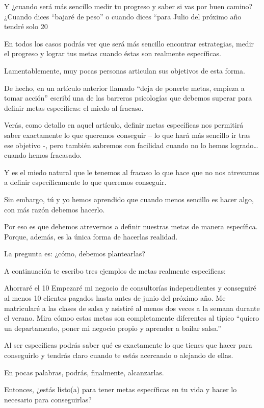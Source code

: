 \documentclass[12pt]{book}
\begin{document}
Y ¿cuando será más sencillo medir tu progreso y saber si vas por buen camino? ¿Cuando dices “bajaré de peso” o cuando dices “para Julio del próximo año tendré solo 20%

En todos los casos podrás ver que será más sencillo encontrar estrategias, medir el progreso y lograr tus metas cuando éstas son realmente específicas.

Lamentablemente, muy pocas personas articulan sus objetivos de esta forma.

De hecho, en un artículo anterior llamado “deja de ponerte metas, empieza a tomar acción” escribí una de las barreras psicologías que debemos superar para definir metas específicas: el miedo al fracaso.

Verás, como detallo en aquel artículo, definir metas específicas nos permitirá saber exactamente lo que queremos conseguir – lo que hará más sencillo ir tras ese objetivo -, pero también sabremos con facilidad cuando no lo hemos logrado… cuando hemos fracasado.

Y es el miedo natural que le tenemos al fracaso lo que hace que no nos atrevamos a definir específicamente lo que queremos conseguir.

Sin embargo, tú y yo hemos aprendido que cuando menos sencillo es hacer algo, con más razón debemos hacerlo.

Por eso es que debemos atrevernos a definir nuestras metas de manera específica. Porque, además, es la única forma de hacerlas realidad.

La pregunta es: ¿cómo, debemos plantearlas?

A continuación te escribo tres ejemplos de metas realmente especificas:

Ahorraré el 10%
Empezaré mi negocio de consultorías independientes y conseguiré al menos 10 clientes pagados hasta antes de junio del próximo año.
Me matricularé a las clases de salsa y asistiré al menos dos veces a la semana durante el verano.
Mira cómoo estas metas son completamente diferentes al típico “quiero un departamento, poner mi negocio propio y aprender a bailar salsa.”

Al ser específicas podrás saber qué es exactamente lo que tienes que hacer para conseguirlo y tendrás claro cuando te estás acercando o alejando de ellas.

En pocas palabras, podrás, finalmente, alcanzarlas.

Entonces, ¿estás listo(a) para tener metas específicas en tu vida y hacer lo necesario para conseguirlas?
\end{document}
